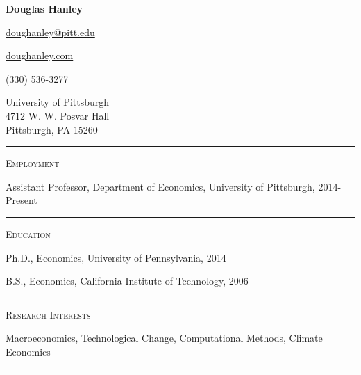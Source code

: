 \documentclass{article}
\begin{document}
\thispagestyle{empty}

\begin{center}
{\LARGE \textbf{Douglas Hanley}}
\end{center}

\begin{center}
\parbox{2.0in}{
\begin{flushright}
\href{mailto:doughanley@pitt.edu}{doughanley@pitt.edu}

\href{http://doughanley.com/}{doughanley.com}

(330) 536-3277
\end{flushright}
}
\hspace{0.5cm}
\parbox{2.0in}{
University of Pittsburgh \\
4712 W. W. Posvar Hall \\
Pittsburgh, PA 15260
}
\end{center}

\hspace{-0.025\textwidth}\rule{1.05\textwidth}{0.1mm}

\vspace{0.3cm}


\parbox{\textwidth}{
\parbox[t]{0.28\textwidth}{ \raggedright \noindent \textsc{ Employment } }
\parbox[t]{0.72\textwidth}{ \raggedright

Assistant Professor, Department of Economics, University of Pittsburgh, 2014-Present
\vspace{0.27cm}

}
\textcolor{light-gray}{\hrule}
}
\vspace{0.3cm}

\parbox{\textwidth}{
\parbox[t]{0.28\textwidth}{ \raggedright \noindent \textsc{ Education } }
\parbox[t]{0.72\textwidth}{ \raggedright

Ph.D., Economics, University of Pennsylvania, 2014
\vspace{0.27cm}

B.S., Economics, California Institute of Technology, 2006
\vspace{0.27cm}

}
\textcolor{light-gray}{\hrule}
}
\vspace{0.3cm}

\parbox{\textwidth}{
\parbox[t]{0.28\textwidth}{ \raggedright \noindent \textsc{ Research Interests } }
\parbox[t]{0.72\textwidth}{ \raggedright

Macroeconomics, Technological Change, Computational Methods, Climate Economics
\vspace{0.27cm}

}
\textcolor{light-gray}{\hrule}
}
\vspace{0.3cm}
\end{document}
